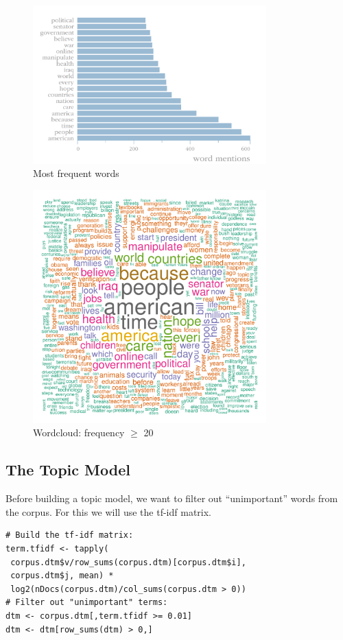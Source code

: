 \documentclass[%
	final,
	notitlepage,
	narroweqnarray,
	inline,
	]{ieee}
\begin{document}
\begin{figure}[ht!]
\centering
\includegraphics[width=90mm]{mostfreq.pdf}
\caption{Most frequent words}
\label{fig:barchart}
\end{figure}

\begin{figure}[ht!]
\centering
\includegraphics[width=90mm]{wordcloud.pdf}
\caption{Wordcloud: frequency $\geq$ 20}
\label{fig:wordcloud}
\end{figure}

\subsection{The Topic Model}

\PARstart Before building a topic model, we want to filter out ``unimportant'' words from
the corpus. For this we will use the tf-idf matrix.

\begin{verbatim}
# Build the tf-idf matrix:
term.tfidf <- tapply(
 corpus.dtm$v/row_sums(corpus.dtm)[corpus.dtm$i], 
 corpus.dtm$j, mean) * 
 log2(nDocs(corpus.dtm)/col_sums(corpus.dtm > 0))
# Filter out "unimportant" terms:
dtm <- corpus.dtm[,term.tfidf >= 0.01]
dtm <- dtm[row_sums(dtm) > 0,]
\end{verbatim}
\end{document}
